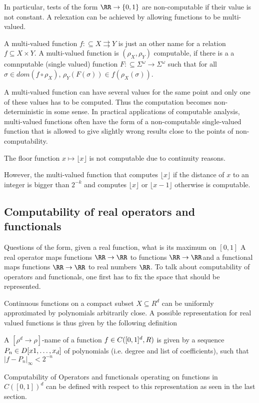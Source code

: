 In particular, tests of the form $\RR \to \{0,1\}$ are non-computable if their
value is not constant. 
A relexation can be achieved by allowing functions to be multi-valued.
\begin{definition}
A multi-valued function $f: \subseteq X \rightrightarrows Y$ is just an other name for a relation $f \subseteq X \times Y$.
A multi-valued function is $(\rho_X, \rho_Y)$ computable, if there is a a comnputable (single valued) function 
$F: \subseteq \Sigma^\omega \to \Sigma^\omega$ such that for all $\sigma \in dom(f \circ \rho_X)$, $\rho_Y(F(\sigma)) \in f(\rho_X(\sigma))$. 
\end{definition}
A multi-valued function can have several values for the same point and only one
of these values has to be computed. 
Thus the computation becomes non-deterministic in some sense.
In practical applications of computable analysis, multi-valued functions often
have the form of a non-computable single-valued function that is allowed to
give slightly wrong results close to the points of non-computability.
\begin{example}
  The floor function $x \mapsto \lfloor x \rfloor$ is not computable due to
  continuity reasons.
  
  However, the multi-valued function that computes $\lfloor x \rfloor$ if the
  distance of $x$ to an integer is bigger than $2^{-k}$ and computes $\lfloor x
  \rfloor$ or $\lfloor x-1 \rfloor$ otherwise is computable.
\end{example}

\subsection{Computability of real operators and functionals}
Questions of the form, given a real function, what is its maximum on $[0,1]$ 
A real operator maps functions $\RR \to \RR$ to functions $\RR \to \RR$and a functional maps functions $\RR \to \RR$ to real numbers $\RR$.
To talk about computability of operators and functionals, one first has to fix
the space that should be represented.

Continuous functions on a compact subset $X \subseteq R^d$ can be uniformly approximated by polynomials arbitrarily close.
A possible representation for real valued functions is thus given by the following definition 
\begin{definition}
A $[\rho^d \to \rho]$-name of a function $f \in C([0,1]^d, \\R)$ is given by a
sequence $P_n \in \\D[x1, \dots, x_d]$ of polynomials (i.e. degree and list of
coefficients), such that $\vert f - P_n \vert_\infty < 2^{-n}$
\end{definition}
Computability of Operators and functionals operating on functions in
$C([0,1])^d$ can be defined with respect to this representation as seen in the
last section.

